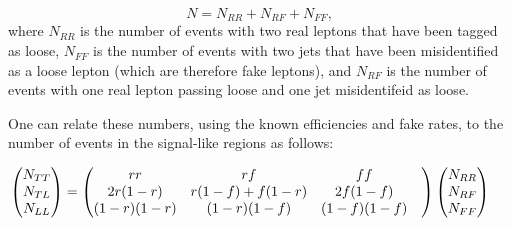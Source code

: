 



\begin{equation}
N = N_{RR} + N_{RF} + N_{FF},
\end{equation}
where $N_{RR}$ is the number of events with two real leptons that have been tagged as loose,
$N_{FF}$ is the number of events with two jets that have been misidentified as a loose lepton (which are therefore fake leptons),
and $N_{RF}$ is the number of events with one real lepton passing loose and one jet misidentifeid as loose.

One can relate these numbers, using the known efficiencies and fake rates, to the number of events in the signal-like regions as follows:

\begin{equation}
  \label{eqn:mm_matrix}
  \hspace{-0.5cm}
  \begin{pmatrix}N_{TT}\\N_{TL}\\N_{LL}\end{pmatrix} 
  = 
  \begin{pmatrix}rr& rf& ff\\ 2r(1-r)& r(1-f) + f(1-r)& 2f(1-f)\\ (1-r)(1-r) & (1-r)(1-f)& (1-f)(1-f)& \\\end{pmatrix}
  \begin{pmatrix}N_{RR}\\N_{RF}\\N_{FF}
  \end{pmatrix}
\end{equation}

